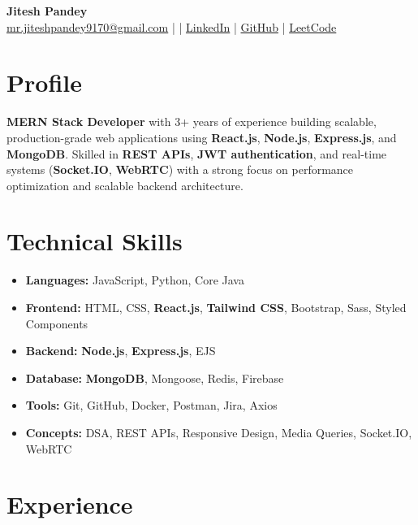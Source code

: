 \documentclass[letterpaper,11pt]{article}
\begin{document}
\begin{center}
    {\LARGE \textbf{Jitesh Pandey}} \\
    \href{mailto:mr.jiteshpandey9170@gmail.com}{mr.jiteshpandey9170@gmail.com} \quad |  \quad | \quad
    \href{https://www.linkedin.com/in/mr-jitesh9170/}{LinkedIn} \quad | \quad
     \href{https://github.com/Mr-Jitesh9170}{GitHub} \quad | \quad
    \href{https://leetcode.com/u/Mr-Jitesh9170/}{LeetCode}
\end{center}

\vspace{4pt}

\section{Profile}
\textbf{MERN Stack Developer} with 3+ years of experience building scalable, production-grade web applications using \textbf{React.js}, \textbf{Node.js}, \textbf{Express.js}, and \textbf{MongoDB}. Skilled in \textbf{REST APIs}, \textbf{JWT authentication}, and real-time systems (\textbf{Socket.IO}, \textbf{WebRTC}) with a strong focus on performance optimization and scalable backend architecture.

\section{Technical Skills}
\begin{itemize}
\item \textbf{Languages:} JavaScript, Python, Core Java
\item \textbf{Frontend:} HTML, CSS, \textbf{React.js}, \textbf{Tailwind CSS}, Bootstrap, Sass, Styled Components
\item \textbf{Backend:} \textbf{Node.js}, \textbf{Express.js}, EJS
\item \textbf{Database:} \textbf{MongoDB}, Mongoose, Redis, Firebase
\item \textbf{Tools:} Git, GitHub, Docker, Postman, Jira, Axios
\item \textbf{Concepts:} DSA, REST APIs, Responsive Design, Media Queries, Socket.IO, WebRTC
\end{itemize}

\section{Experience}
\end{document}
